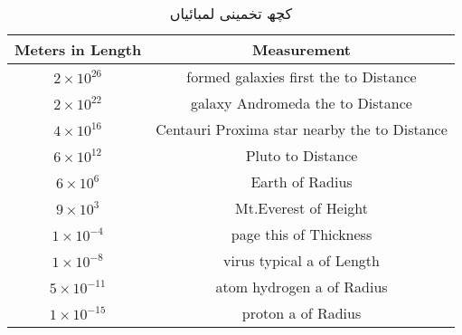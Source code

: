 \documentclass[leqno, b5paper]{khalid-urdu-book}
\begin{document}
	\begin{table}[h!]
		\centering
		\begin{tabular}{|c c|} 
			\hline
			Meters in Length & Measurement\\
			\hline\hline
			$2\times 10^{26}$ & formed galaxies first the to Distance\\
			\hline
			$2\times 10^{22}$ & galaxy Andromeda the to Distance\\
			\hline
			$4\times 10^{16}$ & Centauri Proxima star nearby the to Distance\\
			\hline
			$6\times 10^{12}$ & Pluto to Distance\\
			\hline
			$6\times 10^{6}$ & Earth of Radius\\
			\hline
			$9\times 10^{3}$ & Mt.Everest of Height\\
			\hline
			$1\times 10^{-4}$ & page this of Thickness\\
			\hline
			$1\times 10^{-8}$ & virus typical a of Length\\
			\hline
			$5\times 10^{-11}$ & atom hydrogen a of Radius\\
			\hline
			$1\times 10^{-15}$ & proton a of Radius\\
			\hline
		\end{tabular}
		\caption{کچھ تخمینی لمبائیاں}
		\label{tab:my_label}
	\end{table}
\end{document}
